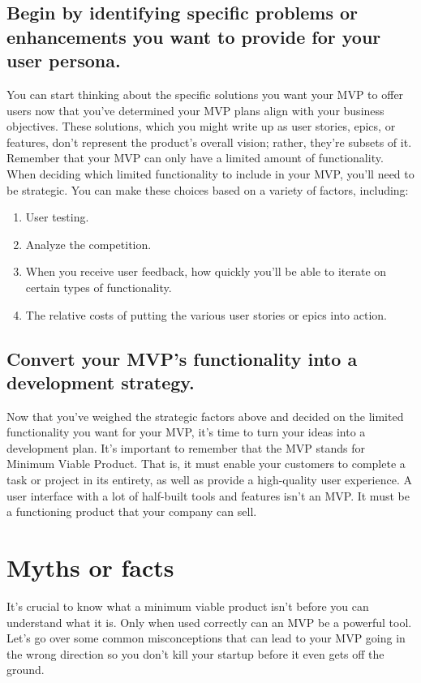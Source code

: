\documentclass[paper=a4, fontsize=11pt]{scrartcl}
\numberwithin{equation}{section}		%
\numberwithin{figure}{section}			%
\numberwithin{table}{section}				%
\begin{document}
\subsection{Begin by identifying specific problems or enhancements you want to provide for your user persona.}
You can start thinking about the specific solutions you want your MVP to offer users now that you've determined your MVP plans align with your business objectives. These solutions, which you might write up as user stories, epics, or features, don't represent the product's overall vision; rather, they're subsets of it. Remember that your MVP can only have a limited amount of functionality.
When deciding which limited functionality to include in your MVP, you'll need to be strategic. You can make these choices based on a variety of factors, including:
\begin{enumerate}
    \item User testing.
    \item Analyze the competition.
    \item When you receive user feedback, how quickly you'll be able to iterate on certain types of functionality.
    \item The relative costs of putting the various user stories or epics into action.
\end{enumerate}
\newpage

\subsection{Convert your MVP's functionality into a development strategy.}
Now that you've weighed the strategic factors above and decided on the limited functionality you want for your MVP, it's time to turn your ideas into a development plan.
It's important to remember that the MVP stands for Minimum Viable Product. That is, it must enable your customers to complete a task or project in its entirety, as well as provide a high-quality user experience. A user interface with a lot of half-built tools and features isn't an MVP. It must be a functioning product that your company can sell.
\newpage
\section{Myths or facts}
It's crucial to know what a minimum viable product isn't before you can understand what it is. Only when used correctly can an MVP be a powerful tool. Let's go over some common misconceptions that can lead to your MVP going in the wrong direction so you don't kill your startup before it even gets off the ground.
\end{document}
